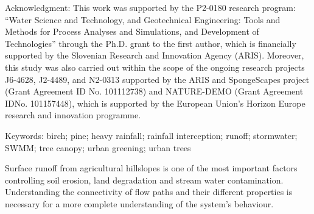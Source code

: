 Acknowledgment: This work was supported by the P2-0180 research program: “Water Science and
Technology, and Geotechnical Engineering: Tools and Methods for Process Analyses and Simulations,
and Development of Technologies” through the Ph.D. grant to the first author, which is financially
supported by the Slovenian Research and Innovation Agency (ARIS). Moreover, this study was also
carried out within the scope of the ongoing research projects J6-4628, J2-4489, and N2-0313
supported by the ARIS and SpongeScapes project (Grant Agreement ID No. 101112738) and
NATURE-DEMO (Grant Agreement IDNo. 101157448), which is supported by the European Union’s
Horizon Europe research and innovation programme.

Keywords: birch; pine; heavy rainfall; rainfall interception; runoff; stormwater; SWMM; tree canopy;
urban greening; urban trees
\newpage{}
{}
\begin{flushleft}







\end{flushleft}

\noindent

Surface runoff from agricultural hillslopes is one of the most important factors controlling soil erosion, land degradation and stream water contamination. Understanding the connectivity of flow paths and their different properties is necessary for a more complete understanding of the system’s behaviour.

